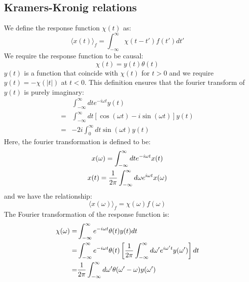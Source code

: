 \documentclass{article}
\begin{document}
\subsection{Kramers-Kronig relations}
We define the response function $\chi(t)$ as:
\begin{equation}
    \langle x(t) \rangle_f = \int_{-\infty}^{\infty} \chi(t-t') f(t') dt'
\end{equation}
We require the response function to be causal:
\begin{equation}
    \chi(t) = y(t)\theta(t)
\end{equation}
$y(t)$ is a function that coincide with $\chi(t)$ for $ t > 0 $ and 
we require $y(t) = - \chi(|t|)$ at $t < 0$. This definition ensures that the 
fourier transform of $y(t)$ is purely imaginary:
\begin{align}
    & \int_{-\infty}^{\infty} dt e^{-i\omega t} y(t) \\
    = & \int_{-\infty}^{\infty} dt [\cos(\omega t) - i \sin(\omega t)] y(t) \\
    = & -2i \int_{0}^{\infty} dt \sin(\omega t) y(t)
\end{align}
Here, the fourier transformation is defined to be:
\begin{gather}
    x(\omega) = \int_{-\infty}^{\infty} dt e^{-i\omega t} x(t) \notag \\
    x(t) = \frac{1}{2\pi} \int_{-\infty}^{\infty} d\omega e^{i\omega t} x(\omega) \notag \\
\end{gather}
and we have the relationship:
\begin{equation}
    \langle x(\omega) \rangle _f = \chi(\omega) f(\omega)
\end{equation}
The Fourier transformation of the response function is:
\begin{align}
    \chi(\omega) = & \int_{-\infty}^{\infty}  e^{-i\omega t}\theta(t) y(t) dt \notag \\
    = & \int_{-\infty}^{\infty}  e^{-i\omega t} \theta(t)  \left[ \frac{1}{2\pi}  \int_{-\infty}^{\infty} d\omega' e^{i\omega' t} y(\omega') \right] dt \notag \\
     = & \frac{1}{2\pi} \int_{-\infty}^{\infty} d\omega' \theta(\omega' - \omega) y (\omega') 
     \label{response_transform}
\end{align}
\end{document}
